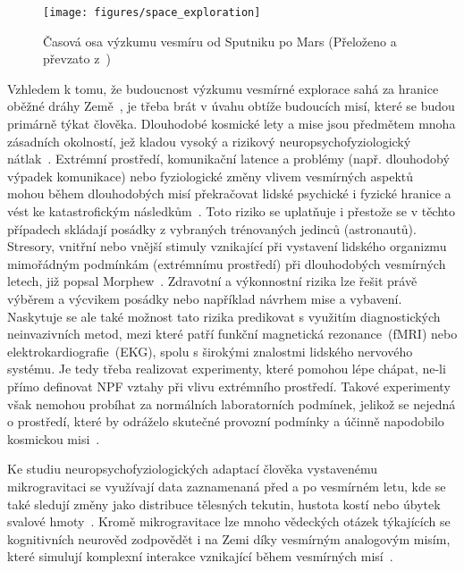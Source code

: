 \begin{figure}[!htb]
    \begin{center}
        \texttt{[image: figures/space\_exploration]}
        \caption{Časová osa výzkumu vesmíru od Sputniku po Mars (Přeloženo a
            převzato z~\cite{bartu})}
        \label{fig:space_exploration}
    \end{center}
\end{figure}

Vzhledem k tomu, že budoucnost výzkumu vesmírné explorace sahá za hranice oběžné
dráhy Země~\cite{salotti2014roadmap,viscio2014methodology}, je třeba brát v
úvahu obtíže budoucích misí, které se budou primárně týkat člověka. Dlouhodobé
kosmické lety a mise jsou předmětem mnoha zásadních okolností, jež kladou vysoký
a rizikový neuropsychofyziologický nátlak~\cite{Mogilever2018}. Extrémní
prostředí, komunikační latence a problémy (např. dlouhodobý výpadek komunikace)
nebo fyziologické změny vlivem vesmírných
aspektů~\cite{Buguet2007,Williams2009,Roy2021} mohou během dlouhodobých misí
překračovat lidské psychické i fyzické hranice a vést ke katastrofickým
následkům~\cite{Strangman2014,Mogilever2018}. Toto riziko se uplatňuje i
přestože se v těchto případech skládají posádky z vybraných trénovaných jedinců
(astronautů). Stresory, vnitřní nebo vnější stimuly vznikající při vystavení
lidského organizmu mimořádným podmínkám (extrémnímu prostředí) při dlouhodobých
vesmírných letech, již popsal Morphew~\cite{morphew2001psychological}. Zdravotní
a výkonnostní rizika lze řešit právě výběrem a výcvikem posádky nebo například
návrhem mise a vybavení. Naskytuje se ale také možnost tato rizika predikovat s
využitím diagnostických neinvazivních metod, mezi které patří funkční magnetická
rezonance~(\gls{fMRI}) nebo elektrokardiografie~(\gls{EKG}), spolu s širokými
znalostmi lidského nervového systému. Je tedy třeba realizovat experimenty,
které pomohou lépe chápat, ne-li přímo definovat NPF vztahy při vlivu extrémního
prostředí. Takové experimenty však nemohou probíhat za normálních laboratorních
podmínek, jelikož se nejedná o prostředí, které by odráželo skutečné provozní
podmínky a účinně napodobilo kosmickou misi~\cite{Mogilever2018,Pagel2016}.

Ke studiu neuropsychofyziologických adaptací člověka vystavenému mikrogravitaci
se využívají data zaznamenaná před a po vesmírném letu, kde se také sledují
změny jako distribuce tělesných tekutin, hustota kostí nebo úbytek svalové
hmoty~\cite{Stein2012WeightMA}. Kromě mikrogravitace lze mnoho vědeckých otázek
týkajících se kognitivních neurověd zodpovědět i na Zemi díky vesmírným
analogovým misím, které simulují komplexní interakce vznikající během vesmírných
misí~\cite{Pagel2016,Mogilever2018}.

